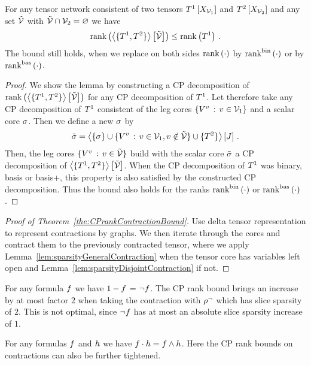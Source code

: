 \begin{lemma}\label{lem:sparsityDisjointContraction}
	For any tensor network consistent of two tensors $T^{1}\left[X_{\mathcal{V}_1}\right]$ and $T^{2}\left[X_{\mathcal{V}_2}\right]$ and any set $\tilde{\mathcal{V}}$ with $\tilde{\mathcal{V}}\cap\mathcal{V}_2=\varnothing$ we have
		\[ \mathrm{rank}\left(\left\langle \{T^{1},T^{2}\}\right\rangle \left[ \tilde{\mathcal{V}} \right]\right) \leq \mathrm{rank}\left(T^{1}\right) \, . \]
	The bound still holds, when we replace on both sides $\mathrm{rank}\left(\cdot\right)$ by $\mathrm{rank}^{\mathrm{bin}}\left(\cdot\right)$ or by $\mathrm{rank}^{\mathrm{bas}}\left(\cdot\right)$.
\end{lemma}
\begin{proof}
	We show the lemma by constructing a CP decomposition of $\mathrm{rank}\left(\left\langle \{T^{1},T^{2}\}\right\rangle \left[ \tilde{\mathcal{V}} \right]\right) $ for any CP decomposition of $T^{1}$.
	Let therefore take any CP decomposition of $T^{1}$ consistent of the leg cores $\{V^{v} \, : \, v \in \mathcal{V}_1 \}$ and a scalar core $\sigma$.
	Then we define a new $\sigma$ by
		\[ \tilde{\sigma} = \left\langle \{\sigma\}\cup \{V^{v} \, : \, v \in \mathcal{V}_1 , v \notin \tilde{\mathcal{V}} \} \cup \{T^{2}\} \right\rangle \left[ J \right] \, . \]
	Then, the leg cores $\{V^{v} \, : \, v \in \tilde{\mathcal{V}} \}$ build with the scalar core $\tilde{\sigma}$ a CP decomposition of $\left\langle \{T^{1},T^{2}\}\right\rangle \left[ \tilde{\mathcal{V}} \right]$.
	When the CP decomposition of $T^{1}$ was binary, basis or basis+, this property is also satisfied by the constructed CP decomposition.
	Thus the bound also holds for the ranks $\mathrm{rank}^{\mathrm{bin}}\left(\cdot\right)$ or $\mathrm{rank}^{\mathrm{bas}}\left(\cdot\right)$.
\end{proof}

\begin{proof}[Proof of Theorem~\ref{the:CPrankContractionBound}]
	Use delta tensor representation to represent contractions by graphs.
	We then iterate through the cores and contract them to the previously contracted tensor, where we apply Lemma~\ref{lem:sparsityGeneralContraction} when the tensor core has variables left open and Lemma~\ref{lem:sparsityDisjointContraction} if not.
\end{proof}


\begin{example}
	For any formula $f$ we have $1-f$ = $\lnot f$.
	The CP rank bound brings an increase by at most factor $2$ when taking the contraction with $\rho^{\lnot}$ which has slice sparsity of $2$.
	This is not optimal, since $\lnot f$ has at most an absolute slice sparsity increase of $1$.
	
	For any formulas $f$ and $h$ we have $f\cdot h = f\land h$.
	Here the CP rank bounds on contractions can also be further tightened.
\end{example}


